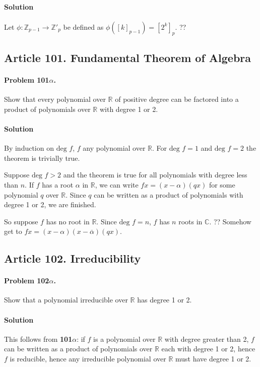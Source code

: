 \paragraph*{Solution}
Let $\phi : \mathbb{Z}_{p-1} \rightarrow \mathbb{Z}'_p$ be defined as
$\phi([k]_{p-1}) = [2^k]_p$. ??

\subsection{Article 101. Fundamental Theorem of Algebra}

\paragraph{Problem 101$\alpha$.}
Show that every polynomial over $\mathbb{R}$ of positive degree can be factored
into a product of polynomials over $\mathbb{R}$ with degree 1 or 2.

\paragraph*{Solution}
By induction on $\mbox{deg } f$, $f$ any polynomial over $\mathbb{R}$. For
$\mbox{deg } f = 1$ and $\mbox{deg } f = 2$ the theorem is trivially true.

Suppose $\mbox{deg } f > 2$ and the theorem is true for all polynomials with
degree less than $n$. If $f$ has a root $\alpha$ in $\mathbb{R}$, we can write
$fx = (x-\alpha)(qx)$ for some polynomial $q$ over $\mathbb{R}$. Since $q$ can
be written as a product of polynomials with degree 1 or 2, we are finished.

So suppose $f$ has no root in $\mathbb{R}$. Since $\mbox{deg } f = n$, $f$ has
$n$ roots in $\mathbb{C}$. ??
Somehow get to $fx = (x-\alpha)(x-\overline{\alpha})(qx)$.

\subsection{Article 102. Irreducibility}

\paragraph{Problem 102$\alpha$.}
Show that a polynomial irreducible over $\mathbb{R}$ has degree 1 or 2.

\paragraph*{Solution}
This follows from \textbf{101$\alpha$}: if $f$ is a polynomial over $\mathbb{R}$
with degree greater than 2, $f$ can be written as a product of polynomials over
$\mathbb{R}$ each with degree 1 or 2, hence $f$ is reducible, hence any
irreducible polynomial over $\mathbb{R}$ must have degree 1 or 2.

